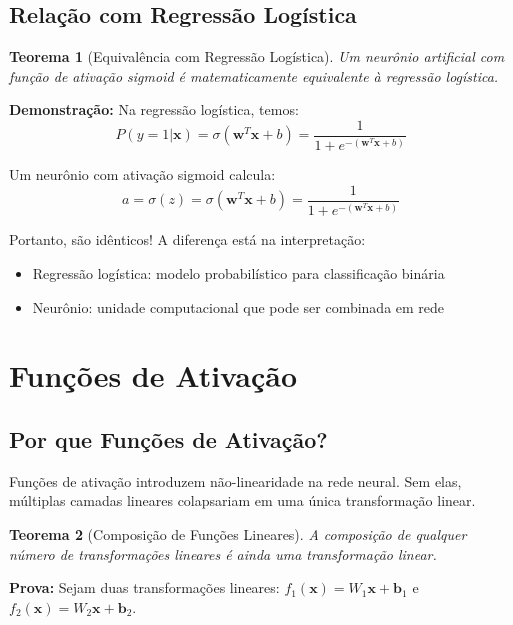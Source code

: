 \documentclass[a4paper,12pt]{article}
\newtheorem{teorema}{Teorema}[section]
\begin{document}
\subsection{Relação com Regressão Logística}

\begin{teorema}[Equivalência com Regressão Logística]
Um neurônio artificial com função de ativação sigmoid é matematicamente equivalente à regressão logística.
\end{teorema}

\textbf{Demonstração:}
Na regressão logística, temos:
\begin{equation}
    P(y=1|\mathbf{x}) = \sigma(\mathbf{w}^T\mathbf{x} + b) = \frac{1}{1 + e^{-(\mathbf{w}^T\mathbf{x} + b)}}
\end{equation}

Um neurônio com ativação sigmoid calcula:
\begin{equation}
    a = \sigma(z) = \sigma(\mathbf{w}^T\mathbf{x} + b) = \frac{1}{1 + e^{-(\mathbf{w}^T\mathbf{x} + b)}}
\end{equation}

Portanto, são idênticos! A diferença está na interpretação:
\begin{itemize}
    \item Regressão logística: modelo probabilístico para classificação binária
    \item Neurônio: unidade computacional que pode ser combinada em rede
\end{itemize}

\section{Funções de Ativação}

\subsection{Por que Funções de Ativação?}

Funções de ativação introduzem não-linearidade na rede neural. Sem elas, múltiplas camadas lineares colapsariam em uma única transformação linear.

\begin{teorema}[Composição de Funções Lineares]
A composição de qualquer número de transformações lineares é ainda uma transformação linear.
\end{teorema}

\textbf{Prova:}
Sejam duas transformações lineares: $f_1(\mathbf{x}) = W_1\mathbf{x} + \mathbf{b}_1$ e $f_2(\mathbf{x}) = W_2\mathbf{x} + \mathbf{b}_2$.
\end{document}
